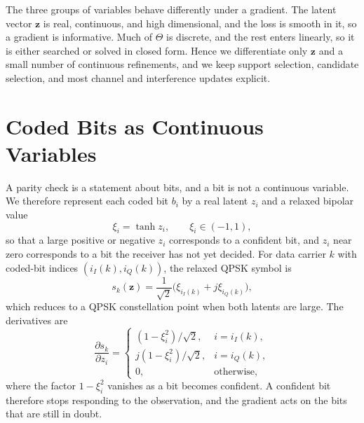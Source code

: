 \documentclass[11pt]{article}
\begin{document}
The three groups of variables behave differently under a gradient.  The latent
vector $\bm z$ is real, continuous, and high dimensional, and the loss is smooth
in it, so a gradient is informative.  Much of $\Theta$ is discrete, and the rest
enters linearly, so it is either searched or solved in closed form.  Hence we
differentiate only $\bm z$ and a small number of continuous refinements, and we
keep support selection, candidate selection, and most channel and interference
updates explicit.

\section{Coded Bits as Continuous Variables}

A parity check is a statement about bits, and a bit is not a continuous
variable.  We therefore represent each coded bit $b_i$ by a real latent $z_i$
and a relaxed bipolar value
\begin{equation}
  \xi_i=\tanh z_i,\qquad \xi_i\in(-1,1),
\end{equation}
so that a large positive or negative $z_i$ corresponds to a confident bit, and
$z_i$ near zero corresponds to a bit the receiver has not yet decided.  For
data carrier $k$ with coded-bit indices $(i_I(k),i_Q(k))$, the relaxed QPSK
symbol is
\begin{equation}
  s_k(\bm z)=\frac{1}{\sqrt 2}\big(\xi_{i_I(k)}+j\xi_{i_Q(k)}\big),
  \label{eq:qpsk}
\end{equation}
which reduces to a QPSK constellation point when both latents are large.  The
derivatives are
\begin{equation}
  \frac{\partial s_k}{\partial z_i}
  =
  \begin{cases}
    (1-\xi_i^2)/\sqrt 2, & i=i_I(k),\\
    j(1-\xi_i^2)/\sqrt 2, & i=i_Q(k),\\
    0, & \text{otherwise,}
  \end{cases}
  \label{eq:symbol_derivative}
\end{equation}
where the factor $1-\xi_i^2$ vanishes as a bit becomes confident.  A confident
bit therefore stops responding to the observation, and the gradient acts on the
bits that are still in doubt.
\end{document}
